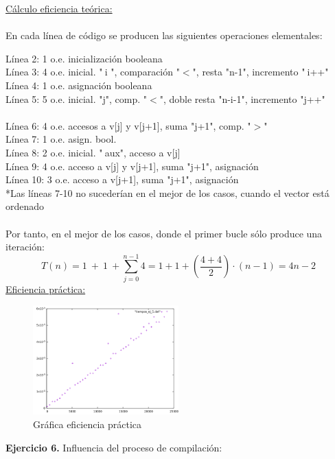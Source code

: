 \documentclass[titlepage, 12pt,a4paper]{article}
\begin{document}
\underline{Cálculo eficiencia teórica:}
\\\\
En cada línea de código se producen las siguientes operaciones elementales:

Línea 2: 1 o.e. inicialización booleana\\
Línea 3: 4 o.e. inicial. "$\ $i ", comparación "$<$", resta "n-1", incremento "$\ $i++"\\
Línea 4: 1 o.e. asignación booleana\\
Línea 5: 5 o.e. inicial. "j", comp. "$<$", doble resta "n-i-1", incremento "j++"\\\\
Línea 6: 4 o.e. accesos a v[j] y v[j+1], suma "j+1", comp. "$>$"\\
Línea 7: 1 o.e. asign. bool.\\
Línea 8: 2 o.e. inicial. "$\ $aux", acceso a v[j]\\
Línea 9: 4 o.e. acceso a v[j] y v[j+1], suma "j+1", asignación\\
Línea 10: 3 o.e. acceso a v[j+1], suma "j+1", asignación\\

*Las líneas 7-10 no sucederían en el mejor de los casos, cuando el vector está ordenado
\ 
\\\\ 
Por tanto, en el mejor de los casos, donde el primer bucle sólo produce una iteración:\\ 
$$T(n)=1\ +\ 1\ +\sum \limits_{j=0}^{n-1} 4= 1+1+(\frac{4+4}{2})\cdot(n-1)= 4n-2 $$
\newpage
\underline{Eficiencia práctica:}\\

\begin{figure}[!ht]
  \caption{Gráfica eficiencia práctica}
  \centering
    \includegraphics[width=0.5\textwidth]{./img/ef_pract_ej_5.png}
\end{figure}
\newpage


\textbf{\large Ejercicio 6.} Influencia del proceso de compilación:\\
\end{document}
